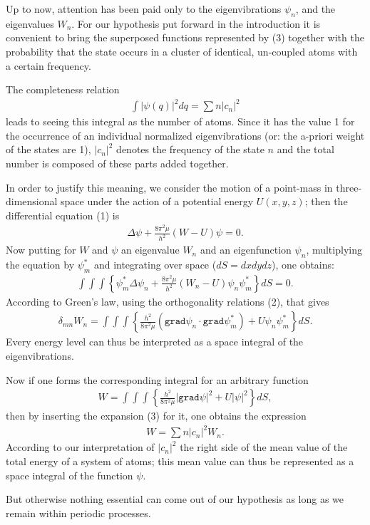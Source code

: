 \documentclass[a4paper,11pt]{article}
\newcommand{\?}[2]{#1\footnote{\textsc{Translator note}: #2}}
\newcommand{\nequ}[2]{\begin{align*}\tag{#1}#2\end{align*}}
\newcommand{\uequ}[1]{\begin{align*}#1\end{align*}}
\renewcommand{\operatorfont}[1]{\texttt{#1}}
\newcommand{\grad}{\operatorfont{grad}}
\begin{document}
Up to now, attention has been paid only to the eigenvibrations $\psi_n$, and the eigenvalues $W_n$. For our hypothesis put forward in the introduction it is convenient to bring the superposed functions represented by (3) together with the probability that the state occurs in a cluster of identical, un-coupled atoms with a certain frequency.

The completeness relation
\nequ{4}{\int\left|\psi(q)\right|^2 dq = \sum{n}\left|c_n\right|^2}
leads to seeing this integral as the number of atoms. Since it has the value 1 for the occurrence of an individual normalized eigenvibrations (or: the a-priori weight of the states are 1), $|c_n|^2$ denotes the frequency of the state $n$ and the total number is composed of these parts added together.

In order to justify this meaning, we consider the motion of a point-mass in three-dimensional space under the action of a potential energy $U(x,y,z)$; then the differential equation (1) is
\nequ{5}{
\Delta\psi + \frac{8\pi^2\mu}{h^2}\left(W-U\right)\psi = 0.
}
Now putting for $W$ and $\psi$ an eigenvalue $W_n$ and an eigenfunction $\psi_n$, multiplying the equation by $\psi_m^*$ and integrating over space ($dS=dx dy dz$), one obtains:
\uequ{
\int\int\int\left\{
\psi^*_m\Delta\psi_n + \frac{8\pi^2\mu}{h^2}\left(W_n - U\right)\psi_n\psi^*_m
\right\}dS = 0.
}
According to Green's law, using the orthogonality relations (2), that gives
\nequ{6}{
\delta_{mn}W_n = \int\int\int\left\{\frac{h^2}{8\pi^2\mu}\left(\grad\psi_n\cdot\grad\psi^*_m\right)+U\psi_n\psi_m^*\right\}dS.
}
Every energy level can thus be interpreted as a space integral of the eigenvibrations.

Now if one forms the corresponding integral for an arbitrary function
\nequ{7}{
W=\int\int\int\left\{\frac{h^2}{8\pi^2\mu}\left|\grad\psi\right|^2 + U\left|\psi\right|^2
\right\}dS,
}
then by inserting the expansion (3) for it, one obtains the expression
\nequ{8}{
W=\sum{n}\left|c_n\right|^2 W_n.
}
According to our interpretation of $\left|c_n\right|^2$ the right side of the mean value of the total energy of a system of atoms; this mean value can thus be represented as a space integral of the function $\psi$.

But otherwise nothing essential can come out of our hypothesis as long as we remain within periodic processes.
\end{document}
